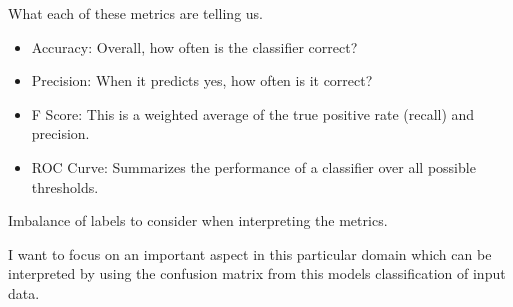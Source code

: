 \documentclass[11pt]{article}
\providecommand{\tightlist}{%
      \setlength{\itemsep}{0pt}\setlength{\parskip}{0pt}}
\begin{document}
    What each of these metrics are telling us.

\begin{itemize}
\tightlist
\item
  Accuracy: Overall, how often is the classifier correct?
\item
  Precision: When it predicts yes, how often is it correct?
\item
  F Score: This is a weighted average of the true positive rate (recall)
  and precision.
\item
  ROC Curve: Summarizes the performance of a classifier over all
  possible thresholds.
\end{itemize}

Imbalance of labels to consider when interpreting the metrics.

I want to focus on an important aspect in this particular domain which
can be interpreted by using the confusion matrix from this models
classification of input data.
\end{document}
